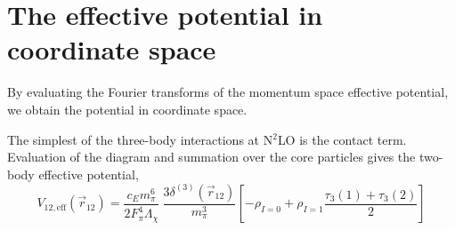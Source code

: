 \documentclass[%
 preprint,
 amsmath,amssymb,
 aps,
]{revtex4-1}
\begin{document}
\section{The effective potential in coordinate space}

By evaluating the Fourier transforms of the momentum space effective potential, we obtain the potential in coordinate space. 

The simplest of the three-body interactions at N$^2$LO is the contact term. Evaluation of the diagram and summation over the core particles gives the two-body effective potential,
\begin{equation}
V_{12,\text{eff}}(\vec{r}_{12})=\frac{c_E m_\pi^6}{2F_\pi^4\Lambda_\chi}\:\frac{3\delta^{(3)}(\vec{r}_{12})}{m_\pi^3}\left[-\rho_{I=0}+ \rho_{I=1}\frac{\tau_3(1)+\tau_3(2)}{2} \right]
\end{equation}
\end{document}
